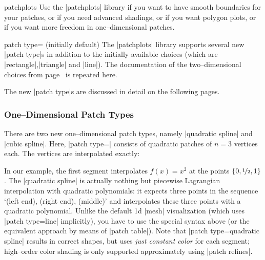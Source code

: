 {\begin{pgfplotslibrary}{patchplots}
	Use the |patchplots| library if you want to have smooth boundaries for your patches, or if you need advanced shadings, or if you want polygon plots, or if you want more freedom in one--dimensional patches. 

%
\begin{pgfplotskey}{patch type= (initially default)}
	The |patchplots| library supports several new |patch type|s in addition to the initially available choices (which are |rectangle|,|triangle| and |line|). The documentation of the two--dimensional choices from page~\pageref{key:patch:type} is repeated here.

	The new |patch type|s are discussed in detail on the following pages.
\end{pgfplotskey} %

\subsubsection{One--Dimensional Patch Types}
	There are two new one--dimensional patch types, namely |quadratic spline| and |cubic spline|. Here, |patch type=| consists of quadratic patches of $n=3$ vertices each. The vertices are interpolated exactly:
\begin{codeexample}[]
\end{codeexample}
	\noindent In our example, the first segment interpolates $f(x)=x^2$ at the points $\{0,\nicefrac12,1\}$. The |quadratic spline| is actually nothing but piecewise Lagrangian interpolation with quadratic polynomials: it expects three points in the sequence `(left end), (right end), (middle)' and interpolates these three points with a quadratic polynomial. Unlike the default 1d |mesh| visualization (which uses |patch type=line| implicitly), you have to use the special syntax above (or the equivalent approach by means of |patch table|). Note that |patch type=quadratic spline| results in correct shapes, but uses \emph{just constant color} for each segment; high--order color shading is only supported approximately using |patch refines|.


\end{pgfplotslibrary}}
